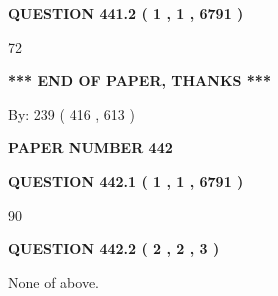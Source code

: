 \documentclass[12pt]{article}
\begin{document}
{\textbf{\Large{QUESTION
441.2 
 ( 1 , 1 , 6791 )
}}}
  
  
 
 
\noindent{}

72
 
 
   
   
 \vspace{0.2in}
 
   
   
   
   
\vspace{1.0in} 
{\textbf{\large{ *** END OF PAPER, THANKS *** }}} 
   
   
\hspace{1.0in} By: 
 239 ( 416 ,  613 )
   
   
   
   
\newpage 
\setcounter{page}{ 
   442001 } 
   
   
   
   
 {\textbf{ \Large{ PAPER NUMBER  442  }}}
   
   
\vspace{0.2in}
   
   
   
   
   
   
 \vspace{0.2in}
 
 
 
 
   
   
  
\vspace{0.2in}
  
{\textbf{\Large{QUESTION
442.1 
 ( 1 , 1 , 6791 )
}}}
  
  
 
 
\noindent{}

90
 
 
  
\vspace{0.2in}
  
{\textbf{\Large{QUESTION
442.2 
 ( 2 , 2 , 3 )
}}}
  
  
 
 
\noindent{}
 
 
 None of above.
 
\end{document}
